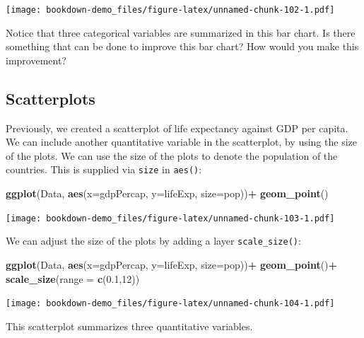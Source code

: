 \documentclass[
]{book}
\newenvironment{Shaded}{\begin{snugshade}}{\end{snugshade}}
\newcommand{\AttributeTok}[1]{\textcolor[rgb]{0.13,0.29,0.53}{#1}}
\newcommand{\DecValTok}[1]{\textcolor[rgb]{0.00,0.00,0.81}{#1}}
\newcommand{\FloatTok}[1]{\textcolor[rgb]{0.00,0.00,0.81}{#1}}
\newcommand{\FunctionTok}[1]{\textcolor[rgb]{0.13,0.29,0.53}{\textbf{#1}}}
\newcommand{\NormalTok}[1]{#1}
\newcommand{\SpecialCharTok}[1]{\textcolor[rgb]{0.81,0.36,0.00}{\textbf{#1}}}
\begin{document}
\texttt{[image: bookdown-demo\_files/figure-latex/unnamed-chunk-102-1.pdf]}

Notice that three categorical variables are summarized in this bar chart. Is there something that can be done to improve this bar chart? How would you make this improvement?

\hypertarget{scatterplots-1}{%
\subsection{Scatterplots}\label{scatterplots-1}}

Previously, we created a scatterplot of life expectancy against GDP per capita. We can include another quantitative variable in the scatterplot, by using the size of the plots. We can use the size of the plots to denote the population of the countries. This is supplied via \texttt{size} in \texttt{aes()}:

\begin{Shaded}
\begin{Highlighting}[]
\FunctionTok{ggplot}\NormalTok{(Data, }\FunctionTok{aes}\NormalTok{(}\AttributeTok{x=}\NormalTok{gdpPercap, }\AttributeTok{y=}\NormalTok{lifeExp, }\AttributeTok{size=}\NormalTok{pop))}\SpecialCharTok{+}
  \FunctionTok{geom\_point}\NormalTok{()}
\end{Highlighting}
\end{Shaded}

\texttt{[image: bookdown-demo\_files/figure-latex/unnamed-chunk-103-1.pdf]}

We can adjust the size of the plots by adding a layer \texttt{scale\_size()}:

\begin{Shaded}
\begin{Highlighting}[]
\FunctionTok{ggplot}\NormalTok{(Data, }\FunctionTok{aes}\NormalTok{(}\AttributeTok{x=}\NormalTok{gdpPercap, }\AttributeTok{y=}\NormalTok{lifeExp, }\AttributeTok{size=}\NormalTok{pop))}\SpecialCharTok{+}
  \FunctionTok{geom\_point}\NormalTok{()}\SpecialCharTok{+}
  \FunctionTok{scale\_size}\NormalTok{(}\AttributeTok{range =} \FunctionTok{c}\NormalTok{(}\FloatTok{0.1}\NormalTok{,}\DecValTok{12}\NormalTok{))}
\end{Highlighting}
\end{Shaded}

\texttt{[image: bookdown-demo\_files/figure-latex/unnamed-chunk-104-1.pdf]}

This scatterplot summarizes three quantitative variables.
\end{document}
